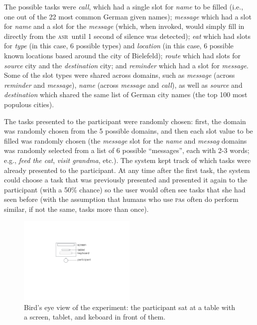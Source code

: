 \documentclass[11pt]{article}
\newcommand{\asr}[0]{\textsc{asr}}
\newcommand{\pa}[0]{\textsc{pa}}
\begin{document}
The possible tasks were \emph{call}, which had a single slot for \emph{name} to be filled (i.e., one out of the 22 most common German given names); \emph{message} which had a slot for \emph{name} and a slot for the \emph{message} (which, when invoked, would simply fill in directly from the \asr\ until 1 second of silence was detected); \emph{eat} which had slots for \emph{type} (in this case, 6 possible types) and \emph{location} (in this case, 6 possible known locations based around the city of Bielefeld); \emph{route} which had slots for \emph{source} city and the \emph{destination} city; and \emph{reminder} which had a slot for \emph{message}. Some of the slot types were shared across domains, such as \emph{message} (across \emph{reminder} and \emph{message}), \emph{name} (across \emph{message} and \emph{call}), as well as \emph{source} and \emph{destination} which shared the same list of German city names (the top 100 most populous cities). 



The tasks presented to the participant were randomly chosen: first, the domain was randomly chosen from the 5 possible domains, and then each slot value to be filled was randomly chosen (the \emph{message} slot for the \emph{name} and \emph{messag} domains was randomly selected from a list of 6 possible ``messages'', each with 2-3 words; e.g., \emph{feed the cat}, \emph{visit grandma}, etc.). The system kept track of which tasks were already presented to the participant. At any time after the first task, the system could choose a task that was previously presented and presented it again to the participant (with a 50\% chance) so the user would often see tasks that she had seen before (with the assumption that humans who use \pa s often do perform similar, if not the same, tasks more than once). 

\begin{figure}[ht]
  \centering
      \includegraphics[width=0.5\textwidth]{figures/dataview.pdf}	
      \caption{Bird's eye view of the experiment: the participant sat at a table with a screen, tablet, and keboard in front of them. \label{fig:dataview}}
\end{figure}
\end{document}
